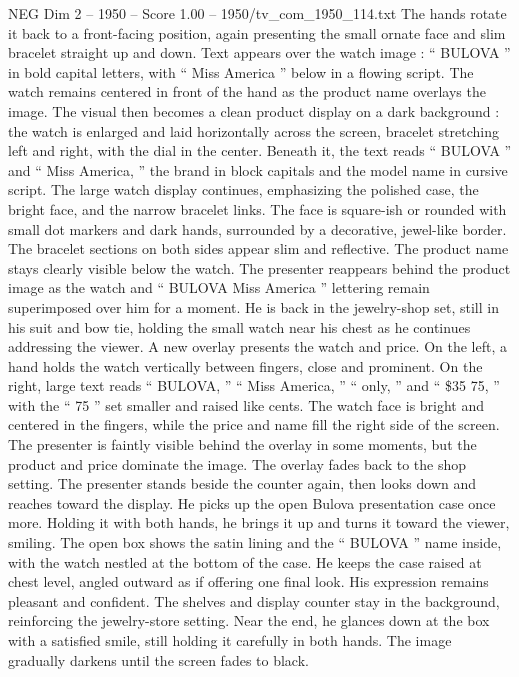 \begin{textsample}{NEG Dim 2 – 1950 – Score 1.00 – 1950/tv\_com\_1950\_114.txt}
The hands rotate it back to a front-facing position, again presenting the small ornate face and slim bracelet straight up and down.
Text appears over the watch image : “ BULOVA ” in bold capital letters, with “ Miss America ” below in a flowing script.
The watch remains centered in front of the hand as the product name overlays the image.
The visual then becomes a clean product display on a dark background : the watch is enlarged and laid horizontally across the screen, bracelet stretching left and right, with the dial in the center.
Beneath it, the text reads “ BULOVA ” and “ Miss America, ” the brand in block capitals and the model name in cursive script.
The large watch display continues, emphasizing the polished case, the bright face, and the narrow bracelet links.
The face is square-ish or rounded with small dot markers and dark hands, surrounded by a decorative, jewel-like border.
The bracelet sections on both sides appear slim and reflective.
The product name stays clearly visible below the watch.
The presenter reappears behind the product image as the watch and “ BULOVA Miss America ” lettering remain superimposed over him for a moment.
He is back in the jewelry-shop set, still in his suit and bow tie, holding the small watch near his chest as he continues addressing the viewer.
A new overlay presents the watch and price.
On the left, a hand holds the watch vertically between fingers, close and prominent.
On the right, large text reads “ BULOVA, ” “ Miss America, ” “ only, ” and “ \$35 75, ” with the “ 75 ” set smaller and raised like cents.
The watch face is bright and centered in the fingers, while the price and name fill the right side of the screen.
The presenter is faintly visible behind the overlay in some moments, but the product and price dominate the image.
The overlay fades back to the shop setting.
The presenter stands beside the counter again, then looks down and reaches toward the display.
He picks up the open Bulova presentation case once more.
Holding it with both hands, he brings it up and turns it toward the viewer, smiling.
The open box shows the satin lining and the “ BULOVA ” name inside, with the watch nestled at the bottom of the case.
He keeps the case raised at chest level, angled outward as if offering one final look.
His expression remains pleasant and confident.
The shelves and display counter stay in the background, reinforcing the jewelry-store setting.
Near the end, he glances down at the box with a satisfied smile, still holding it carefully in both hands.
The image gradually darkens until the screen fades to black.

\end{textsample}
